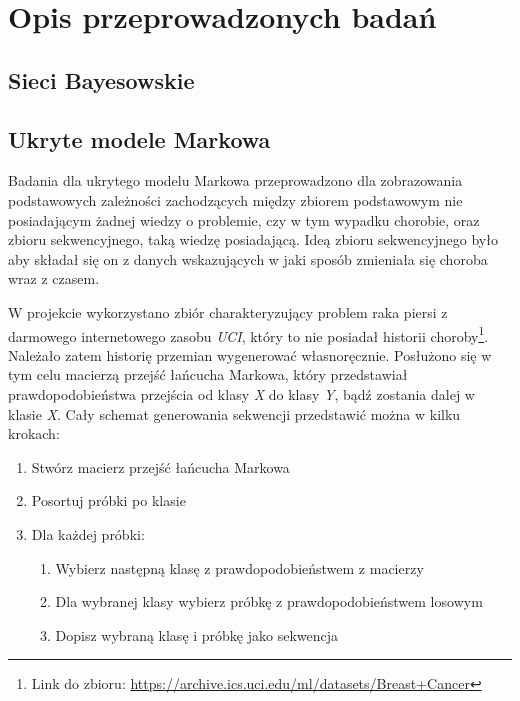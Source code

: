 \newpage

\section{Opis przeprowadzonych badań}

\subsection{Sieci Bayesowskie}

\subsection{Ukryte modele Markowa}

Badania dla ukrytego modelu Markowa przeprowadzono dla zobrazowania podstawowych zależności zachodzących między zbiorem podstawowym nie posiadającym żadnej wiedzy o problemie, czy w tym wypadku chorobie, oraz zbioru sekwencyjnego, taką wiedzę posiadającą. Ideą zbioru sekwencyjnego było aby składał się on z danych wskazujących w jaki sposób zmieniała się choroba wraz z czasem.

W projekcie wykorzystano zbiór charakteryzujący problem raka piersi z darmowego internetowego zasobu \textit{UCI}, który to nie posiadał historii choroby\footnote{Link do zbioru: \url{https://archive.ics.uci.edu/ml/datasets/Breast+Cancer}}. Należało zatem historię przemian wygenerować własnoręcznie. Posłużono się w tym celu macierzą przejść łańcucha Markowa, który przedstawiał prawdopodobieństwa przejścia od klasy \textit{X} do klasy \textit{Y}, bądź zostania dalej w klasie \textit{X}. Cały schemat generowania sekwencji przedstawić można w kilku krokach:
\\
\begin{enumerate}
  \item Stwórz macierz przejść łańcucha Markowa
  \item Posortuj próbki po klasie
  \item Dla każdej próbki:
    \begin{enumerate}
    \item Wybierz następną klasę z prawdopodobieństwem z macierzy
    \item Dla wybranej klasy wybierz próbkę z prawdopodobieństwem losowym
    \item Dopisz wybraną klasę i próbkę jako sekwencja
    \end{enumerate}
\end{enumerate}


